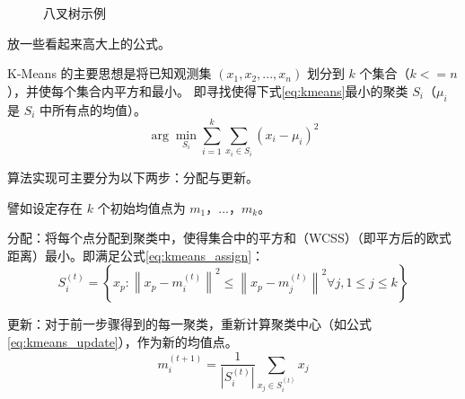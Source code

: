 \begin{figure}
  \centering
    {
    }
    {
    }
  \caption{八叉树示例}
  \label{fig:octree}
\end{figure}

放一些看起来高大上的公式。

K-Means 的主要思想是将已知观测集 $(x_1,x_2,...,x_n)$ 划分到 $k$ 个集合（$k<=n$），并使每个集合内平方和最小。
即寻找使得下式\eqref{eq:kmeans}最小的聚类 $S_i$（$\mu_i$ 是 $S_i$ 中所有点的均值）。
\begin{equation}
  \arg \min_{S_i} \sum_{i=1}^{k} \sum_{x_i \in S_i} (x_i - \mu_i)^2
  \label{eq:kmeans}
\end{equation}

算法实现可主要分为以下两步：分配与更新。

譬如设定存在 $k$ 个初始均值点为 $m_1$，...，$m_k$。

分配：将每个点分配到聚类中，使得集合中的平方和（WCSS）（即平方后的欧式距离）最小。即满足公式\eqref{eq:kmeans_assign}：
\begin{equation}
  S_{i}^{{(t)}}=\left\{x_{p}:\left\|x_{p}-m_{i}^{{(t)}}\right\|^{2}\leq \left\|x_{p}-m_{j}^{{(t)}}\right\|^{2}\forall j,1\leq j\leq k\right\}
  \label{eq:kmeans_assign}
\end{equation}


更新：对于前一步骤得到的每一聚类，重新计算聚类中心（如公式\eqref{eq:kmeans_update}），作为新的均值点。
\begin{equation}
  m_{i}^{{(t+1)}}={\frac  {1}{\left|S_{i}^{{(t)}}\right|}}\sum _{{x_{j}\in S_{i}^{{(t)}}}}x_{j}
  \label{eq:kmeans_update}
\end{equation}


